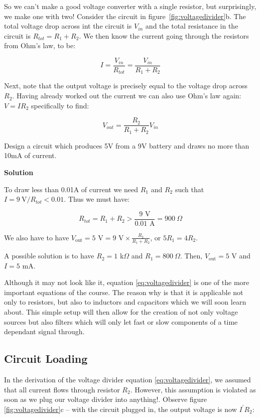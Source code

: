 \documentclass{tufte-book}
\newcommand\Solution{\par\textbf{\textsf{Solution}}\par\medskip}
\begin{document}
So we can't make a good voltage converter with a single resistor, but surprisingly, we make one with two! Consider the circuit in figure~\ref{fig:voltagedivider}b. The total voltage drop across int the circuit is $V_{in}$ and the total resistance in the circuit is $R_{tot} = R_1 + R_2$. We then know the current going through the resistors from Ohm's law, to be: 

\begin{equation}\label{eq:vd_deriv1}
I = \frac{V_{in}}{R_{tot}} = \frac{V_{in}}{R_1 + R_2}
\end{equation}

Next, note that the output voltage is precisely equal to the voltage drop across $R_2$. Having already worked out the current we can also use Ohm's law again: $V = IR_2$ specifically to find:

\begin{equation}\label{eq:voltagedivider}
\boxed{V_{out} = \frac{R_2}{R_1+R_2}V_{in}}
\end{equation}

\begin{myexample}[label = ex:voltage_divider]{Design a circuit which produces 5V from a 9V battery and draws no more than 10mA of current.}
\Solution
To draw less than 0.01A of current we need $R_1$ and $R_2$ such that $I = 9~\text{V}/R_{tot} < 0.01$. Thus we must have:

\begin{equation}
R_{tot} = R_1 + R_2 > \frac{9\text{ V}}{0.01\text{ A}} = 900~\Omega
\end{equation}


\noindent We also have to have $V_\text{out} = 5\text{ V} = 9\text{ V} \times \frac{R_2}{R_1+R_2}$, or $5R_1 = 4R_2$.

\noindent A possible solution is to have $R_2 = 1$ k$\Omega$ and $R_1 = 800~\Omega$. Then, $V_\text{out} = 5\text{ V}$ and $I = 5$ mA.

\end{myexample}


Although it may not look like it, equation \ref{eq:voltagedivider} is one of the more important equations of the course. The reason why is that it is applicable not only to resistors, but also to inductors and capacitors which we will soon learn about. This simple setup will then allow for the creation of not only voltage sources but also filters which will only let fast or slow components of a time dependant signal through.


\subsection{Circuit Loading} In the derivation of the voltage divider equation \ref{eq:voltagedivider}, we assumed that all current flows through resistor $R_2$. However, this assumption is violated as soon as we plug our voltage divider into anything!. Observe figure \ref{fig:voltagedivider}c -- with the circuit plugged in, the output voltage is now $I^\prime R_2$:
\end{document}
